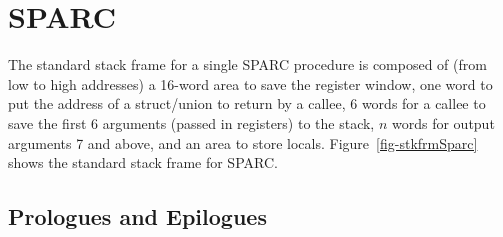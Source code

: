 \section*{SPARC}

The standard stack frame for a single SPARC procedure is composed
of (from low to high addresses) a 16-word area to save the register
window, one word to put the address of a struct/union to return by a
callee, 6 words for a callee to save the first 6 arguments (passed
in registers) to the stack, $n$ words for output arguments 7 and
above, and an area to store locals.  Figure~\ref{fig-stkfrmSparc}
shows the standard stack frame for SPARC.

\centerfigbegin
{}


\subsection{Prologues and Epilogues}

